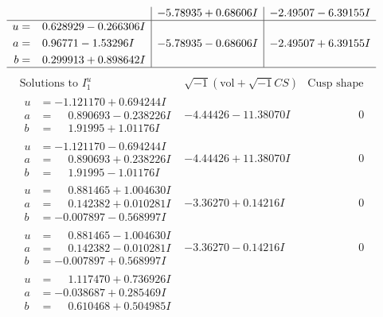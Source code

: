 \documentclass[1p]{elsarticle_modified}
\theoremstyle{definition}
\newcommand{\I}{\sqrt{-1}}
\begin{document}
$$\begin{array}{c|c|c}
 & -5.78935 + 0.68606 I & -2.49507 - 6.39155 I \\ \hline\begin{aligned}
u &= \phantom{-}0.628929 - 0.266306 I \\
a &= \phantom{-}0.96771 - 1.53296 I \\
b &= \phantom{-}0.299913 + 0.898642 I\end{aligned}
 & -5.78935 - 0.68606 I & -2.49507 + 6.39155 I\\
 \hline 
 \end{array}$$\newpage$$\begin{array}{c|c|c}  
\text{Solutions to }I^u_{1}& \I (\text{vol} + \sqrt{-1}CS) & \text{Cusp shape}\\
 \hline 
\begin{aligned}
u &= -1.121170 + 0.694244 I \\
a &= \phantom{-}0.890693 - 0.238226 I \\
b &= \phantom{-}1.91995 + 1.01176 I\end{aligned}
 & -4.44426 - 11.38070 I & \phantom{-0.000000 } 0 \\ \hline\begin{aligned}
u &= -1.121170 - 0.694244 I \\
a &= \phantom{-}0.890693 + 0.238226 I \\
b &= \phantom{-}1.91995 - 1.01176 I\end{aligned}
 & -4.44426 + 11.38070 I & \phantom{-0.000000 } 0 \\ \hline\begin{aligned}
u &= \phantom{-}0.881465 + 1.004630 I \\
a &= \phantom{-}0.142382 + 0.010281 I \\
b &= -0.007897 - 0.568997 I\end{aligned}
 & -3.36270 + 0.14216 I & \phantom{-0.000000 } 0 \\ \hline\begin{aligned}
u &= \phantom{-}0.881465 - 1.004630 I \\
a &= \phantom{-}0.142382 - 0.010281 I \\
b &= -0.007897 + 0.568997 I\end{aligned}
 & -3.36270 - 0.14216 I & \phantom{-0.000000 } 0 \\ \hline\begin{aligned}
u &= \phantom{-}1.117470 + 0.736926 I \\
a &= -0.038687 + 0.285469 I \\
b &= \phantom{-}0.610468 + 0.504985 I\end{aligned}

\end{array}$$
\end{document}
